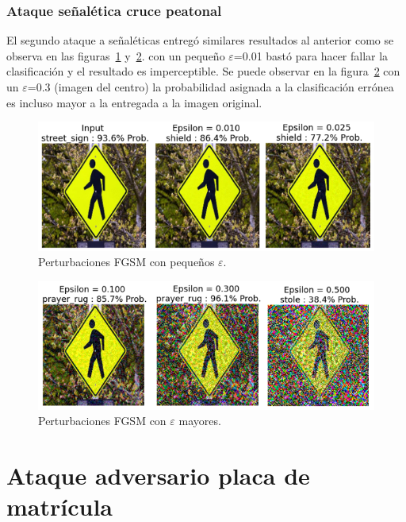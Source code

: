 \subsubsection{Ataque señalética cruce peatonal}
El segundo ataque a señaléticas entregó similares resultados al anterior como se observa en las figuras~\ref{fig:49} y~\ref{fig:50}. con un pequeño $\varepsilon$=0.01 bastó para hacer fallar la clasificación y el resultado es imperceptible. Se puede observar en la figura~\ref{fig:50} con un $\varepsilon$=0.3 (imagen del centro) la probabilidad asignada a la clasificación errónea es incluso mayor a la entregada a la imagen original.

\begin{figure}[!h]
\centering
\includegraphics[scale = 0.85]{Figures/figura_49.PNG}
\decoRule
\caption[Perturbaciones FGSM con pequeños $\varepsilon$ en cruce peatonal]{Perturbaciones FGSM con pequeños $\varepsilon$.}
\label{fig:49}
\end{figure}

\begin{figure}[!h]
\centering
\includegraphics[scale = 0.83]{Figures/figura_50.PNG}
\decoRule
\caption[Perturbaciones FGSM con mayores $\varepsilon$ en cruce peatonal]{Perturbaciones FGSM con $\varepsilon$ mayores.}
\label{fig:50}
\end{figure}


\section{Ataque adversario placa de matrícula}

